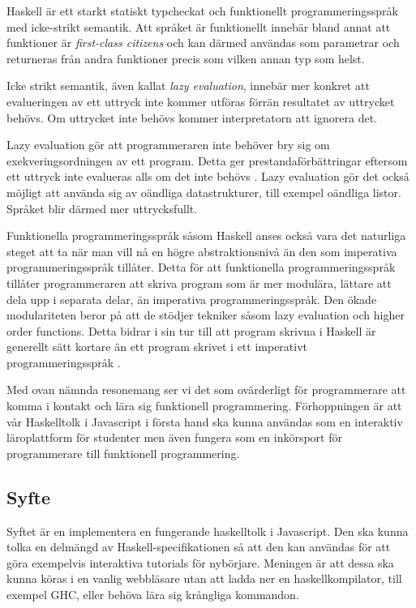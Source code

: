 Haskell är ett starkt statiskt typcheckat och funktionellt programmeringsspråk med icke-strikt semantik. %
Att språket är funktionellt innebär bland annat att funktioner är \emph{first-class citizens} och kan därmed användas som parametrar och returneras från andra funktioner precis som vilken annan typ som helst.

Icke strikt semantik, även kallat \emph{lazy evaluation}, innebär mer konkret att evalueringen av ett uttryck inte kommer utföras förrän resultatet av uttrycket behövs. Om uttrycket inte behövs  kommer interpretatorn att ignorera det. %

Lazy evaluation gör att programmeraren inte behöver bry sig om exekveringsordningen av ett program. Detta ger prestandaförbättringar eftersom ett uttryck inte evalueras alls om det inte behövs \citep{hudak89}.
Lazy evaluation gör det också möjligt att använda sig av oändliga datastrukturer, till exempel oändliga listor. Språket blir därmed mer uttrycksfullt. 

Funktionella programmeringsspråk såsom Haskell anses också vara det naturliga steget att ta när man vill nå en högre abstraktionsnivå än den som imperativa programmeringsspråk tillåter. %
Detta för att funktionella programmeringsspråk tillåter programmeraren att skriva program som är mer modulära, lättare att dela upp i separata delar, än imperativa programmeringsspråk. Den ökade modulariteten beror på att de stödjer tekniker såsom lazy evaluation och higher order functions.
Detta bidrar i sin tur till att program skrivna i Haskell är generellt sätt kortare än ett program skrivet i ett imperativt programmeringsspråk  \citep{why}.

Med ovan nämnda resonemang ser vi det som ovärderligt för programmerare att komma i kontakt och lära sig funktionell programmering. 
Förhoppningen är att vår Haskelltolk i Javascript i första hand ska kunna användas som en interaktiv läroplattform för studenter men även fungera som en inkörsport för programmerare till funktionell programmering. 


\subsection{Syfte}
Syftet är en implementera en fungerande haskelltolk i Javascript. Den ska kunna tolka en delmängd av Haskell-specifikationen så att den kan användas för att göra exempelvis interaktiva tutorials för nybörjare.
Meningen är att dessa ska kunna köras i en vanlig webbläsare utan att ladda ner en haskellkompilator, till exempel GHC, eller behöva lära sig krångliga kommandon.

